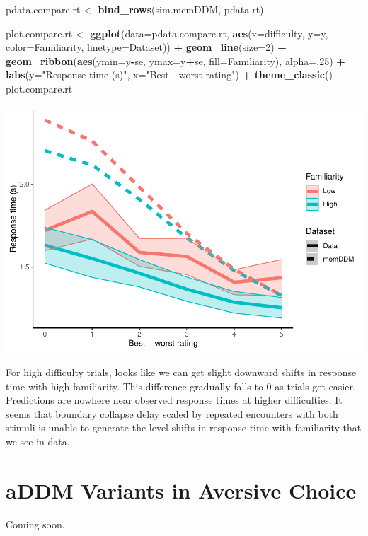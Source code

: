 \documentclass[
]{book}
\newenvironment{Shaded}{\begin{snugshade}}{\end{snugshade}}
\newcommand{\AttributeTok}[1]{\textcolor[rgb]{0.13,0.29,0.53}{#1}}
\newcommand{\DecValTok}[1]{\textcolor[rgb]{0.00,0.00,0.81}{#1}}
\newcommand{\FunctionTok}[1]{\textcolor[rgb]{0.13,0.29,0.53}{\textbf{#1}}}
\newcommand{\NormalTok}[1]{#1}
\newcommand{\OtherTok}[1]{\textcolor[rgb]{0.56,0.35,0.01}{#1}}
\newcommand{\SpecialCharTok}[1]{\textcolor[rgb]{0.81,0.36,0.00}{\textbf{#1}}}
\newcommand{\StringTok}[1]{\textcolor[rgb]{0.31,0.60,0.02}{#1}}
\begin{document}
\begin{Shaded}
\begin{Highlighting}[]
\NormalTok{pdata.compare.rt }\OtherTok{\textless{}{-}} \FunctionTok{bind\_rows}\NormalTok{(sim.memDDM, pdata.rt)}

\NormalTok{plot.compare.rt }\OtherTok{\textless{}{-}} \FunctionTok{ggplot}\NormalTok{(}\AttributeTok{data=}\NormalTok{pdata.compare.rt, }\FunctionTok{aes}\NormalTok{(}\AttributeTok{x=}\NormalTok{difficulty, }\AttributeTok{y=}\NormalTok{y, }\AttributeTok{color=}\NormalTok{Familiarity, }\AttributeTok{linetype=}\NormalTok{Dataset)) }\SpecialCharTok{+}
  \FunctionTok{geom\_line}\NormalTok{(}\AttributeTok{size=}\DecValTok{2}\NormalTok{) }\SpecialCharTok{+}
  \FunctionTok{geom\_ribbon}\NormalTok{(}\FunctionTok{aes}\NormalTok{(}\AttributeTok{ymin=}\NormalTok{y}\SpecialCharTok{{-}}\NormalTok{se, }\AttributeTok{ymax=}\NormalTok{y}\SpecialCharTok{+}\NormalTok{se, }\AttributeTok{fill=}\NormalTok{Familiarity), }\AttributeTok{alpha=}\NormalTok{.}\DecValTok{25}\NormalTok{) }\SpecialCharTok{+}
  \FunctionTok{labs}\NormalTok{(}\AttributeTok{y=}\StringTok{"Response time (s)"}\NormalTok{, }\AttributeTok{x=}\StringTok{"Best {-} worst rating"}\NormalTok{) }\SpecialCharTok{+}
  \FunctionTok{theme\_classic}\NormalTok{()}
\NormalTok{plot.compare.rt}
\end{Highlighting}
\end{Shaded}

\includegraphics{LateNightBayes_files/figure-latex/unnamed-chunk-68-1.pdf}

For high difficulty trials, looks like we can get slight downward shifts in response time with high familiarity. This difference gradually falls to 0 as trials get easier. Predictions are nowhere near observed response times at higher difficulties. It seems that boundary collapse delay scaled by repeated encounters with both stimuli is unable to generate the level shifts in response time with familiarity that we see in data.

\hypertarget{addmvariants}{%
\chapter{aDDM Variants in Aversive Choice}\label{addmvariants}}

Coming soon.

  
\end{document}
